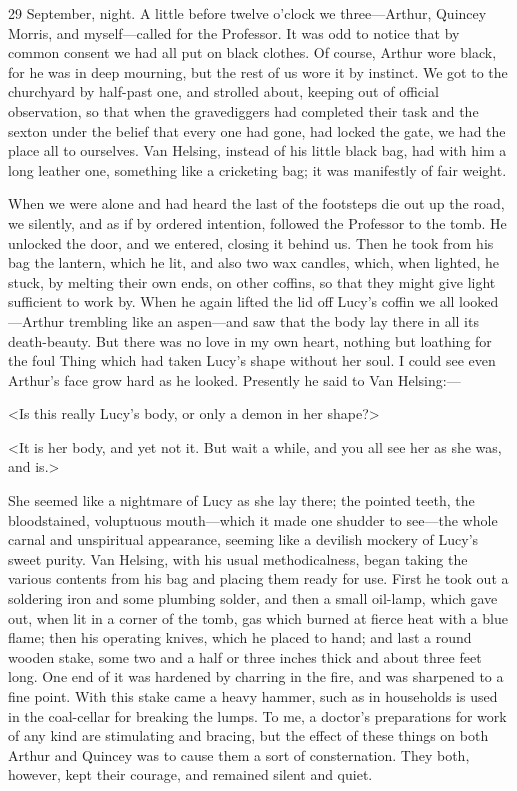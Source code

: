 \begin{diary}{29 September, night.}
A little before twelve o'clock we three—Arthur, Quincey Morris, and myself—called for the Professor. It was odd to notice that by common consent we had all put on black clothes. Of course, Arthur wore black, for he was in deep mourning, but the rest of us wore it by instinct. We got to the churchyard by half-past one, and strolled about, keeping out of official observation, so that when the gravediggers had completed their task and the sexton under the belief that every one had gone, had locked the gate, we had the place all to ourselves. Van Helsing, instead of his little black bag, had with him a long leather one, something like a cricketing bag; it was manifestly of fair weight.

When we were alone and had heard the last of the footsteps die out up the road, we silently, and as if by ordered intention, followed the Professor to the tomb. He unlocked the door, and we entered, closing it behind us. Then he took from his bag the lantern, which he lit, and also two wax candles, which, when lighted, he stuck, by melting their own ends, on other coffins, so that they might give light sufficient to work by. When he again lifted the lid off Lucy's coffin we all looked—Arthur trembling like an aspen—and saw that the body lay there in all its death-beauty. But there was no love in my own heart, nothing but loathing for the foul Thing which had taken Lucy's shape without her soul. I could see even Arthur's face grow hard as he looked. Presently he said to Van Helsing:—

<Is this really Lucy's body, or only a demon in her shape?>

<It is her body, and yet not it. But wait a while, and you all see her as she was, and is.>

She seemed like a nightmare of Lucy as she lay there; the pointed teeth, the bloodstained, voluptuous mouth—which it made one shudder to see—the whole carnal and unspiritual appearance, seeming like a devilish mockery of Lucy's sweet purity. Van Helsing, with his usual methodicalness, began taking the various contents from his bag and placing them ready for use. First he took out a soldering iron and some plumbing solder, and then a small oil-lamp, which gave out, when lit in a corner of the tomb, gas which burned at fierce heat with a blue flame; then his operating knives, which he placed to hand; and last a round wooden stake, some two and a half or three inches thick and about three feet long. One end of it was hardened by charring in the fire, and was sharpened to a fine point. With this stake came a heavy hammer, such as in households is used in the coal-cellar for breaking the lumps. To me, a doctor's preparations for work of any kind are stimulating and bracing, but the effect of these things on both Arthur and Quincey was to cause them a sort of consternation. They both, however, kept their courage, and remained silent and quiet.


\end{diary}
